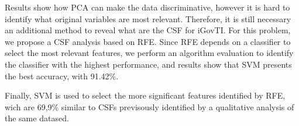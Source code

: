 Results show how PCA can make the data discriminative, however it is hard to identify what original variables are most relevant. Therefore, it is still necessary an additional method to reveal what are the CSF for iGovTI. For this problem, we propose a CSF analysis based on RFE. Since RFE depends on a classifier to select the most relevant features, we perform an algorithm evaluation to identify the classifier with the highest performance, and results show that SVM \cite{hearst1998support} presents the best accuracy, with 91.42\%. 

Finally, SVM is used to select the more significant features identified by RFE, wich are 69,9\% similar to CSFs previsously identified by a qualitative analysis of the same datased.